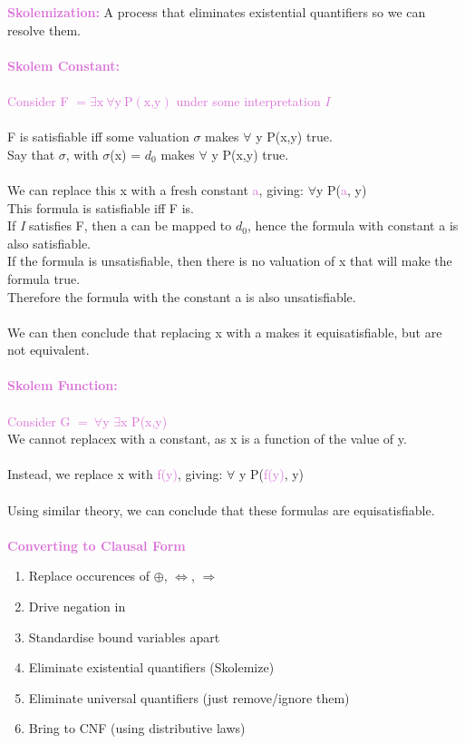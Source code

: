 \documentclass[a4paper,10pt]{article}
\begin{document}
\newpage
\noindent \textcolor{Orchid}{\textbf{Skolemization:}} A process that eliminates existential quantifiers so we can resolve them.\\ \\
\noindent \textcolor{Orchid}{\textbf{Skolem Constant:}}\\ \\
\indent \textcolor{Orchid}{Consider F $= \exists \textrm{x} \ \forall \textrm{y} \ \textrm{P}(\textrm{x,y})$ under some interpretation \textit{I} }\\ \\
\indent F is satisfiable iff some valuation $\sigma$ makes $\forall$ y P(x,y) true. \\
\indent Say that $\sigma$, with $\sigma$(x) = $d_{0}$ makes $\forall$ y P(x,y) true. \\\\
\indent We can replace this x with a fresh constant \textcolor{Orchid}{a}, giving: $\forall$y P(\textcolor{Orchid}{a}, y) \\
\indent This formula is satisfiable iff F is.\\
\indent  If \emph{I} satisfies F, then a can be mapped to $d_{0}$, hence the formula with constant a is also satisfiable.\\
\indent If the formula is unsatisfiable, then there is no valuation of x that will make the formula true. \\
\indent Therefore the formula with the constant a is also unsatisfiable. \\ \\
\indent We can then conclude that replacing x with a makes it equisatisfiable, but are not equivalent.\\\\
\noindent \textcolor{Orchid}{\textbf{Skolem Function:}}\\ \\
\indent \textcolor{Orchid}{Consider G $= \ \forall$y $\exists$x P(x,y)} \\
\indent We cannot replacex with a constant, as x is a function of the value of y. \\ \\
\indent Instead, we replace x with \textcolor{Orchid}{f(y)}, giving: $\forall$ y P(\textcolor{Orchid}{f(y)}, y)\\ \\
\indent Using similar theory, we can conclude that these formulas are equisatisfiable. \\\\
\noindent \textcolor{Orchid}{\textbf{Converting to Clausal Form}}
\begin{enumerate}
\item Replace occurences of $\oplus$, $\Leftrightarrow$, $\Rightarrow$
\item Drive negation in 
\item Standardise bound variables apart 
\item Eliminate existential quantifiers (Skolemize)
\item Eliminate universal quantifiers (just remove/ignore them)
\item Bring to CNF (using distributive laws)
\end{enumerate}
\newpage 
\end{document}
